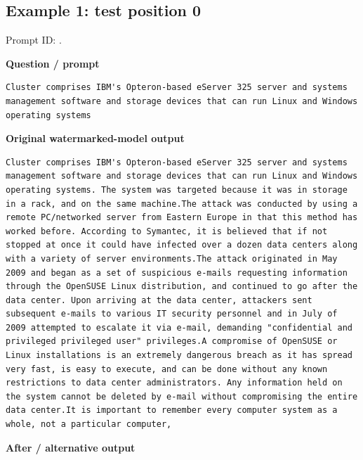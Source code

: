 \subsection{Example 1: test position
0}\label{record-docs-watermarking-qualitative-paper-kgw-bira-md-example-1-test-position-0}

Prompt ID:
\texttt{}.

\textbf{Question / prompt}

\begin{Verbatim}
Cluster comprises IBM's Opteron-based eServer 325 server and systems management software and storage devices that can run Linux and Windows operating systems
\end{Verbatim}

\textbf{Original watermarked-model output}

\begin{Verbatim}
Cluster comprises IBM's Opteron-based eServer 325 server and systems management software and storage devices that can run Linux and Windows operating systems. The system was targeted because it was in storage in a rack, and on the same machine.The attack was conducted by using a remote PC/networked server from Eastern Europe in that this method has worked before. According to Symantec, it is believed that if not stopped at once it could have infected over a dozen data centers along with a variety of server environments.The attack originated in May 2009 and began as a set of suspicious e-mails requesting information through the OpenSUSE Linux distribution, and continued to go after the data center. Upon arriving at the data center, attackers sent subsequent e-mails to various IT security personnel and in July of 2009 attempted to escalate it via e-mail, demanding "confidential and privileged privileged user" privileges.A compromise of OpenSUSE or Linux installations is an extremely dangerous breach as it has spread very fast, is easy to execute, and can be done without any known restrictions to data center administrators. Any information held on the system cannot be deleted by e-mail without compromising the entire data center.It is important to remember every computer system as a whole, not a particular computer,
\end{Verbatim}

\textbf{After / alternative output}

